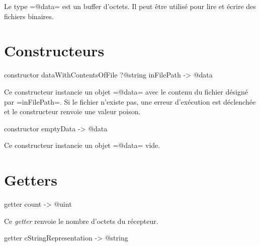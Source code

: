



Le type \ggs=@data= est un buffer d'octets. Il peut être utilisé pour lire et écrire des fichiers binaires.




\section{Constructeurs}



\begin{galgas}
constructor dataWithContentsOfFile ?@string inFilePath -> @data
\end{galgas}

Ce constructeur instancie un objet \ggs=@data= avec le contenu du fichier désigné par \ggs=inFilePath=. Si le fichier n'existe pas, une erreur d'exécution est déclenchée et le constructeur renvoie une valeur poison.





\begin{galgas}
constructor emptyData -> @data
\end{galgas}

Ce constructeur instancie un objet \ggs=@data= vide.








\section{Getters}




\begin{galgas}
getter count -> @uint
\end{galgas}

Ce \emph{getter} renvoie le nombre d'octets du récepteur.



\begin{galgas}
getter cStringRepresentation -> @string
\end{galgas}

